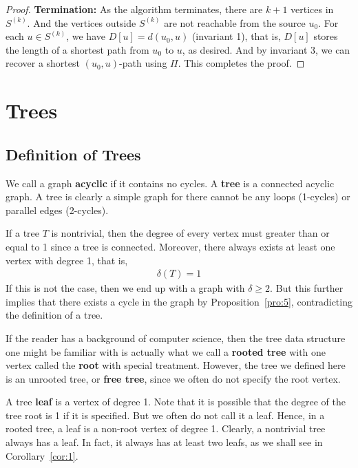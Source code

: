 \documentclass[thmcnt=section, 12pt, color=cyan]{my-elegantbook}
\begin{document}
\begin{proof}
    \noindent\textbf{Termination:} As the algorithm terminates, there are $k+1$ vertices in $S^{(k)}$. And the vertices outside $S^{(k)}$ are not reachable from the source $u_0$. For each $u \in S^{(k)}$, we have $D[u] = d(u_0, u)$ (invariant 1), that is, $D[u]$ stores the length of a shortest path from $u_0$ to $u$, as desired. And by invariant 3, we can recover a shortest $(u_0, u)$-path using $\Pi$. This completes the proof.
\end{proof}


\chapter{Trees}


\section{Definition of Trees}

We call a graph \textbf{acyclic}
if it contains no cycles.
A \textbf{tree} is a connected acyclic graph.
A tree is clearly a simple graph for there cannot be any loops (1-cycles)
or parallel edges (2-cycles).

If a tree $T$ is nontrivial, then the degree of every vertex
must greater than or equal to 1 since a tree is connected.
Moreover, there always exists at least one vertex with degree 1,
that is,
\begin{align*}
    \delta(T) = 1
\end{align*}
If this is not the case, then we end up with a graph with 
$\delta \geq 2$. 
But this further implies that there exists a cycle
in the graph by Proposition~\ref{pro:5}, 
contradicting the definition of a tree.

If the reader has a background of computer science,
then the tree data structure one might be familiar with
is actually what we call a \textbf{rooted tree}
with one vertex called the \textbf{root} 
with special treatment.
However, the tree we defined here is an unrooted tree, 
or \textbf{free tree},
since we often do not specify the root vertex.

A tree \textbf{leaf} is a vertex of degree 1. 
Note that it is possible that the degree of the tree root is 1
if it is specified.
But we often do not call it a leaf.
Hence, in a rooted tree, a leaf is a non-root vertex of degree 1.
Clearly, a nontrivial tree always has a leaf.
In fact, it always has at least two leafs,
as we shall see in Corollary~\ref{cor:1}.
\end{document}
